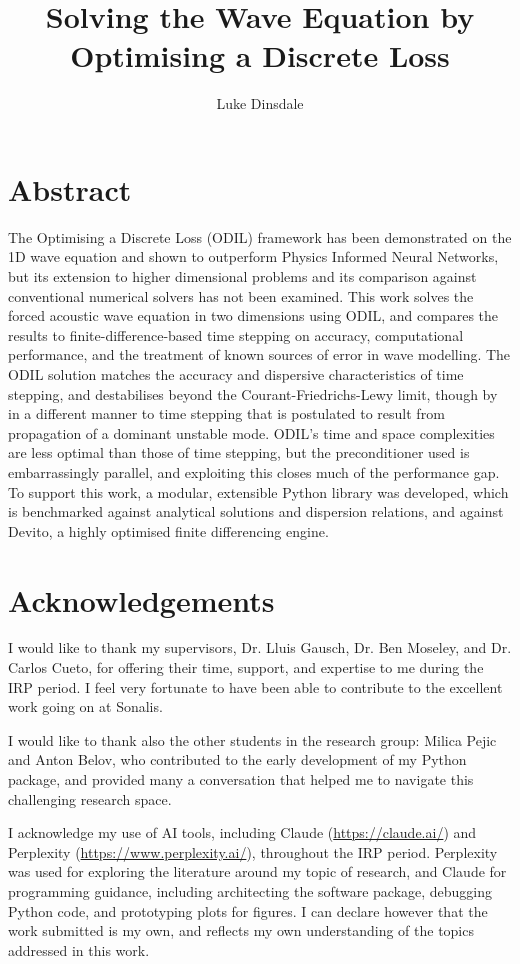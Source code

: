 \documentclass[final-report]{report-template}
\title{Solving the Wave Equation by Optimising a Discrete Loss}
\author{Luke Dinsdale}
\begin{document}

\maketitlepage  %

\section*{Abstract}
\label{sect:abstract}

The Optimising a Discrete Loss (ODIL) framework has been demonstrated on the 1D wave equation and shown to outperform Physics Informed Neural Networks, but its extension to higher dimensional problems and its comparison against conventional numerical solvers has not been examined. This work solves the forced acoustic wave equation in two dimensions using ODIL, and compares the results to finite-difference-based time stepping on accuracy, computational performance, and the treatment of known sources of error in wave modelling. The ODIL solution matches the accuracy and dispersive characteristics of time stepping, and destabilises beyond the Courant-Friedrichs-Lewy limit, though by in a different manner to time stepping that is postulated to result from propagation of a dominant unstable mode. ODIL's time and space complexities are less optimal than those of time stepping, but the preconditioner used is embarrassingly parallel, and exploiting this closes much of the performance gap. To support this work, a modular, extensible Python library was developed, which is benchmarked against analytical solutions and dispersion relations, and against Devito, a highly optimised finite differencing engine.

\section*{Acknowledgements}
I would like to thank my supervisors, Dr. Lluis Gausch, Dr. Ben Moseley, and Dr. Carlos Cueto, for offering their time, support, and expertise to me during the IRP period. I feel very fortunate to have been able to contribute to the excellent work going on at Sonalis. 

I would like to thank also the other students in the research group: Milica Pejic and Anton Belov, who contributed to the early development of my Python package, and provided many a conversation that helped me to navigate this challenging research space.

I acknowledge my use of AI tools, including Claude (\url{https://claude.ai/}) and Perplexity (\url{https://www.perplexity.ai/}), throughout the IRP period. Perplexity was used for exploring the literature around my topic of research, and Claude for programming guidance, including architecting the software package, debugging Python code, and prototyping plots for figures. I can declare however that the work submitted is my own, and reflects my own understanding of the topics addressed in this work. 
\end{document}

